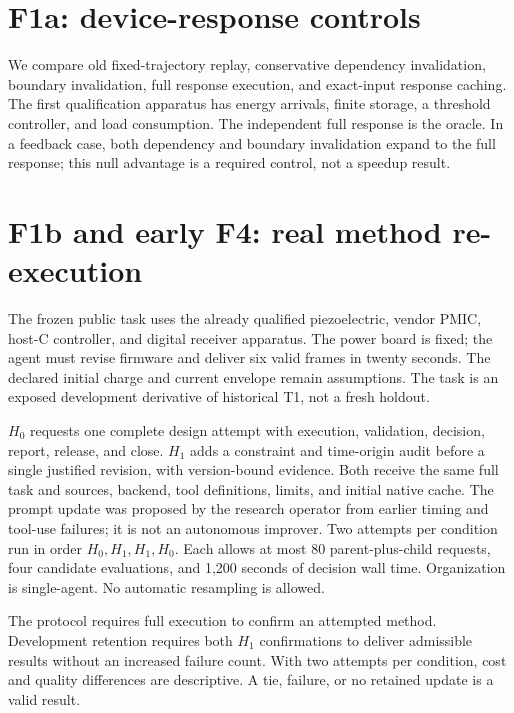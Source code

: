 \documentclass[10pt]{article}
\begin{document}
\section{F1a: device-response controls}
We compare old fixed-trajectory replay, conservative dependency invalidation,
boundary invalidation, full response execution, and exact-input response caching.
The first qualification apparatus has energy arrivals, finite storage, a threshold
controller, and load consumption. The independent full response is the oracle.
In a feedback case, both dependency and boundary invalidation expand to the full
response; this null advantage is a required control, not a speedup result.


\section{F1b and early F4: real method re-execution}
The frozen public task uses the already qualified piezoelectric, vendor PMIC,
host-C controller, and digital receiver apparatus. The power board is fixed; the
agent must revise firmware and deliver six valid frames in twenty seconds.
The declared initial charge and current envelope remain assumptions. The task is
an exposed development derivative of historical T1, not a fresh holdout.

$H_0$ requests one complete design attempt with execution, validation, decision,
report, release, and close. $H_1$ adds a constraint and time-origin audit before a
single justified revision, with version-bound evidence. Both receive the same
full task and sources, backend, tool definitions, limits, and initial native cache.
The prompt update was proposed by the research operator from earlier timing and
tool-use failures; it is not an autonomous improver. Two attempts per condition run
in order $H_0,H_1,H_1,H_0$. Each allows at most 80 parent-plus-child requests,
four candidate evaluations, and 1,200 seconds of decision wall time. Organization
is single-agent. No automatic resampling is allowed.

The protocol requires full execution to confirm an attempted method. Development retention requires
both $H_1$ confirmations to deliver admissible results without an increased
failure count. With two attempts per condition, cost and quality differences are
descriptive. A tie, failure, or no retained update is a valid result.

\end{document}
